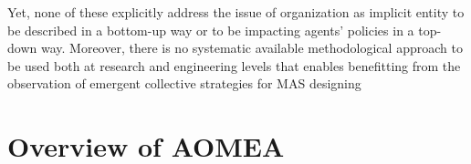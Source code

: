 \documentclass[runningheads]{llncs}
\begin{document}



Yet, none of these explicitly address the issue of organization as implicit entity to be described in a bottom-up way or to be impacting agents' policies in a top-down way. Moreover, there is no systematic available methodological approach to be used both at research and engineering levels that enables benefitting from the observation of emergent collective strategies for MAS designing


\section{Overview of AOMEA}
\end{document}
